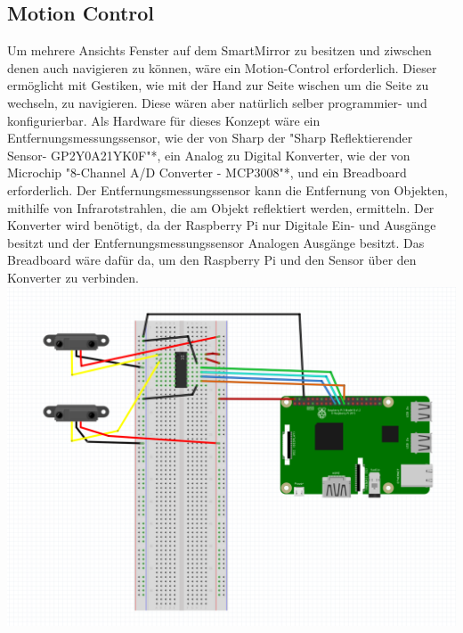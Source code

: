 \subsection{Motion Control}
Um mehrere Ansichts Fenster auf dem SmartMirror zu besitzen und ziwschen denen auch navigieren zu können, wäre ein Motion-Control erforderlich. Dieser ermöglicht mit Gestiken, wie mit der Hand zur Seite wischen um die Seite zu wechseln, zu navigieren. Diese wären aber natürlich selber programmier- und konfigurierbar. 
Als Hardware für dieses Konzept wäre ein Entfernungsmessungssensor, wie der von Sharp der "Sharp Reflektierender Sensor- GP2Y0A21YK0F"*, ein Analog zu Digital Konverter, wie der von Microchip "8-Channel A/D Converter - MCP3008"*, und ein Breadboard erforderlich.
Der Entfernungsmessungssensor kann die Entfernung von Objekten, mithilfe von Infrarotstrahlen, die am Objekt reflektiert werden, ermitteln. Der Konverter wird benötigt, da der Raspberry Pi nur Digitale Ein- und Ausgänge besitzt und der Entfernungsmessungssensor Analogen Ausgänge besitzt. Das Breadboard wäre dafür da, um den Raspberry Pi und den Sensor über den Konverter zu verbinden.
\includegraphics[]{pictures/Motion-Control_Plan.PNG}